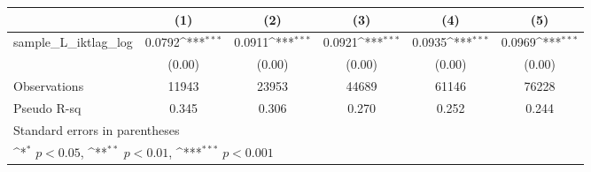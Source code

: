 {
\def\sym#1{\ifmmode^{#1}\else\(^{#1}\)\fi}
\begin{tabular}{l*{5}{c}}
\hline\hline
          &\multicolumn{1}{c}{(1)}         &\multicolumn{1}{c}{(2)}         &\multicolumn{1}{c}{(3)}         &\multicolumn{1}{c}{(4)}         &\multicolumn{1}{c}{(5)}         \\
\hline
sample\_L\_iktlag\_log&   0.0792\sym{***}&   0.0911\sym{***}&   0.0921\sym{***}&   0.0935\sym{***}&   0.0969\sym{***}\\
          &   (0.00)         &   (0.00)         &   (0.00)         &   (0.00)         &   (0.00)         \\
\hline
Observations&    11943         &    23953         &    44689         &    61146         &    76228         \\
Pseudo R-sq&    0.345         &    0.306         &    0.270         &    0.252         &    0.244         \\
\hline\hline
\multicolumn{6}{l}{\footnotesize Standard errors in parentheses}\\
\multicolumn{6}{l}{\footnotesize \sym{*} \(p<0.05\), \sym{**} \(p<0.01\), \sym{***} \(p<0.001\)}\\
\end{tabular}
}
